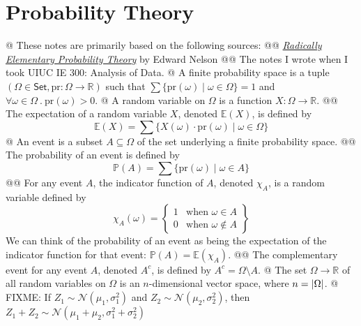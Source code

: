 \documentclass[]{article}
\DeclarePairedDelimiter{\abs}{\lvert}{\rvert}
\newcommand{\textbs}[1]{{\sffamily\fontseries{sbc}\selectfont #1}}
\newcommand{\mbb}[1]{\ensuremath{\mathbb{#1}}}     %
\newcommand{\mrm}[1]{\ensuremath{\mathrm{#1}}}     %
\newcommand{\mcl}[1]{\ensuremath{\mathcal{#1}}}    %
\newcommand{\catset}[0]{\ensuremath{\mathsf{Set}}}
\renewcommand{\complement}[1]{{{#1}^{c}}}
\newcommand{\define}[1]{\textbs{#1}}
\begin{document}

\section{Probability Theory}

\begin{easylist}[itemize]
@ These notes are primarily based on the following sources:
@@ {%
  \href{https://web.math.princeton.edu/~nelson/books/rept.pdf}{%
    \textit{Radically Elementary Probability Theory}}
  by Edward Nelson
}
@@ {%
  The notes I wrote when I took UIUC IE 300: Analysis of Data.
}
@ {%
  A \define{finite probability space} is a tuple
  $(\Omega \in \catset, \mathrm{pr} : \Omega \to \mbb{R})$ such
  that $\sum \{\mrm{pr}(\omega) \mid \omega \in \Omega\} = 1$
  and $\forall \omega \in \Omega ~.~ \mathrm{pr}(\omega) > 0$.
}
@ {%
  A \define{random variable} on $\Omega$ is a function $X : \Omega \to \mbb{R}$.
}
@@ {%
  The \define{expectation} of a random variable $X$, denoted $\mbb{E}(X)$, is
  defined by
  \begin{equation*}
  \mbb{E}(X)
  = \sum \{ X(\omega) \cdot \mrm{pr}(\omega) \mid \omega \in \Omega \}
  \end{equation*}
  \vspace{-2em}
}
@ {%
  An \define{event} is a subset $A \subseteq \Omega$ of the set underlying a
  finite probability space.
}
@@ {%
  The \define{probability} of an event is defined by
  \begin{equation*}
  \mbb{P}(A)
  = \sum \{ \mrm{pr}(\omega) \mid \omega \in A \}
  \end{equation*}
  \vspace{-2em}
}
@@ {%
  For any event $A$, the \define{indicator function} of $A$, denoted $\chi_A$,
  is a random variable defined by
  \begin{equation*}
  \chi_A(\omega)
  = \left\{
  \begin{array}{lr}
    1 & \text{when } \omega \in    A \\
    0 & \text{when } \omega \notin A
  \end{array}
  \right\}
  \end{equation*}
  We can think of the probability of an event as being the expectation of the
  indicator function for that event: $\mbb{P}(A) = \mbb{E}(\chi_A)$.
}
@@ {%
  The \define{complementary event} for any event $A$, denoted $\complement{A}$,
  is defined by $\complement{A} = \Omega \setminus A$.
}
@ {%
  The set $\Omega \to \mbb{R}$ of all random variables on $\Omega$ is an
  $n$-dimensional vector space, where $n = \abs{\Omega}$.
}
@ {%
  FIXME: If $Z_1 \sim \mcl{N}(\mu_1, \sigma_1^2)$
  and $Z_2 \sim \mcl{N}(\mu_2, \sigma_2^2)$,
  then $Z_1 + Z_2 \sim \mcl{N}(\mu_1 + \mu_2, \sigma_1^2 + \sigma_2^2)$
}
\end{easylist}
\end{document}
